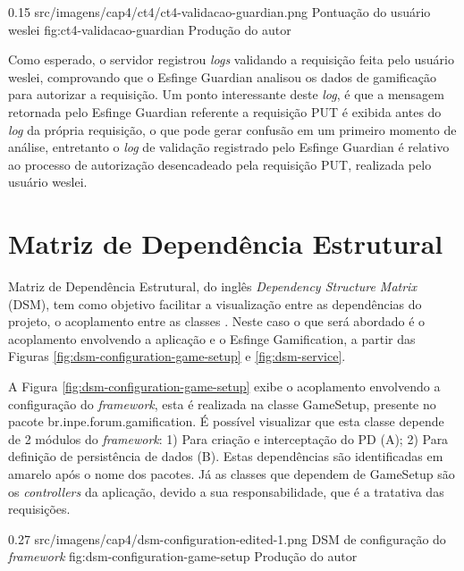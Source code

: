 \begin{image}
{0.15}
{src/imagens/cap4/ct4/ct4-validacao-guardian.png}
{Pontuação do usuário weslei}
{fig:ct4-validacao-guardian}
{Produção do autor}
\end{image}

\par Como esperado, o servidor registrou \textit{logs} validando a requisição feita pelo usuário weslei, comprovando que o Esfinge Guardian analisou os dados de gamificação para autorizar a requisição. Um ponto interessante deste \textit{log}, é que a mensagem retornada pelo Esfinge Guardian referente a requisição PUT é exibida antes do \textit{log} da própria requisição, o que pode gerar confusão em um primeiro momento de análise, entretanto o \textit{log} de validação registrado pelo Esfinge Guardian é relativo ao processo de autorização desencadeado pela requisição PUT, realizada pelo usuário weslei.

\section{Matriz de Dependência Estrutural}

\par Matriz de Dependência Estrutural, do inglês \textit{Dependency Structure Matrix} (DSM), tem como objetivo facilitar a visualização entre as dependências do projeto, o acoplamento entre as classes \cite{browning2001applying}. Neste caso o que será abordado é o acoplamento envolvendo a aplicação e o Esfinge Gamification, a partir das Figuras \ref{fig:dsm-configuration-game-setup} e \ref{fig:dsm-service}.

\par A Figura \ref{fig:dsm-configuration-game-setup} exibe o acoplamento envolvendo a configuração do \textit{framework}, esta é realizada na classe GameSetup, presente no pacote br.inpe.forum.gamification. É possível visualizar que esta classe depende de 2 módulos do \textit{framework}: 1) Para criação e interceptação do PD (A); 2) Para definição de persistência de dados (B). Estas dependências são identificadas em amarelo após o nome dos pacotes. Já as classes que dependem de GameSetup são os \textit{controllers} da aplicação, devido a sua responsabilidade, que é a tratativa das requisições.

\begin{image}
{0.27}
{src/imagens/cap4/dsm-configuration-edited-1.png}
{DSM de configuração do \textit{framework}}
{fig:dsm-configuration-game-setup}
{Produção do autor}
\end{image}

